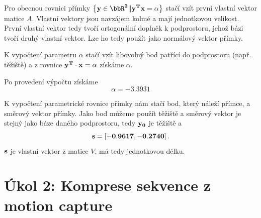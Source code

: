 \begin{enumerate}
    Pro obecnou rovnici přímky \( \left\{ \bf{y} \in \bbR^2 \| \bf{y}^T \bf{x} = \alpha \right\} \) stačí vzít první vlastní vektor matice \( A \). Vlastní vektory jsou navzájem kolmé a mají jednotkovou velikost. První vlastní vektor tedy tvoří ortogonální doplněk k podprostoru, jehož bázi tvoří druhý vlastní vektor. Lze ho tedy použít jako normálový vektor přímky.

    K vypočtení parametru \( \alpha \) stačí vzít libovolný bod patřící do podprostoru (např. těžiště) a z rovnice \( \bf{y}^T \cdot \bf{x} = \alpha \) získáme \( \alpha \).

    Po provedení výpočtu získáme
    \[ \alpha = -3.3931 \]

    K vypočtení parametrické rovnice přímky nám stačí bod, který náleží přímce, a směrový vektor přímky. Jako bod můžeme použít těžiště a směrový vektor je stejný jako báze daného podprostoru, tedy \( \bf{y}_0 \) je těžiště a
    \[ \bf{s} = \left[ -0.9617, -0.2740 \right]. \] \( \bf{s} \) je vlastní vektor z matice \( V \), má tedy jednotkovou délku.
\end{enumerate}

\newpage

\section{Úkol 2: Komprese sekvence z motion capture}

